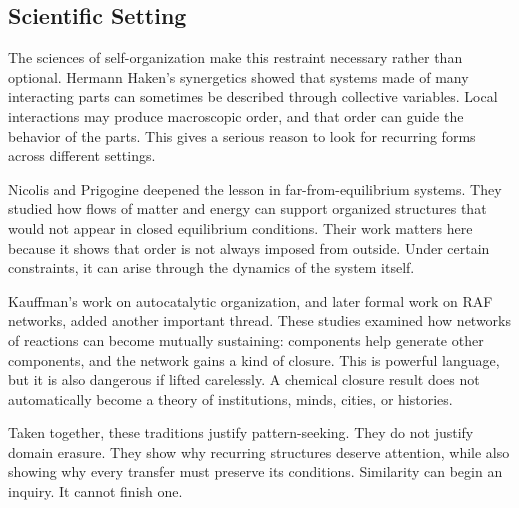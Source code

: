 \documentclass[11pt,a4paper,openany]{book}
\begin{document}
\subsection{Scientific Setting}
The sciences of self-organization make this restraint necessary rather than optional. Hermann Haken's synergetics showed that systems made of many interacting parts can sometimes be described through collective variables. Local interactions may produce macroscopic order, and that order can guide the behavior of the parts. This gives a serious reason to look for recurring forms across different settings. \cite{haken_synergetics,nicolis_prigogine_selforg}\par
Nicolis and Prigogine deepened the lesson in far-from-equilibrium systems. They studied how flows of matter and energy can support organized structures that would not appear in closed equilibrium conditions. Their work matters here because it shows that order is not always imposed from outside. Under certain constraints, it can arise through the dynamics of the system itself.\par
Kauffman's work on autocatalytic organization, and later formal work on RAF networks, added another important thread. These studies examined how networks of reactions can become mutually sustaining: components help generate other components, and the network gains a kind of closure. This is powerful language, but it is also dangerous if lifted carelessly. A chemical closure result does not automatically become a theory of institutions, minds, cities, or histories.\par
Taken together, these traditions justify pattern-seeking. They do not justify domain erasure. They show why recurring structures deserve attention, while also showing why every transfer must preserve its conditions. Similarity can begin an inquiry. It cannot finish one.\par
\end{document}
